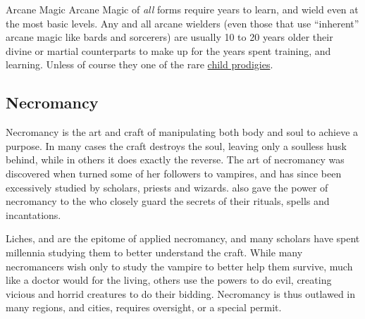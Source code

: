 \begin{35e}{Arcane Magic}
  Arcane Magic of \emph{all} forms require years to learn, and wield even at
  the most basic levels. Any and all arcane wielders (even those that use
  ``inherent'' arcane magic like bards and sorcerers) are usually 10 to 20
  years older their divine or martial counterparts to make up for the years
  spent training, and learning. Unless of course they one of the rare
  \hyperref[sec:Graham Balance]{child prodigies}.
\end{35e}

\subsection{Necromancy}
\label{sec:Necromancy}

Necromancy is the art and craft of manipulating both body and soul to achieve
a purpose. In many cases the craft destroys the soul, leaving only a soulless
husk behind, while in others it does exactly the reverse. The art of
necromancy was discovered when  turned some of her
followers to vampires, and has since been excessively studied by scholars,
priests and wizards.  also gave the power of necromancy to
the  who closely guard the secrets of their rituals, spells
and incantations.

Liches, and  are the epitome of applied necromancy, and
many scholars have spent millennia studying them to better understand the
craft. While many necromancers wish only to study the vampire to better help
them survive, much like a doctor would for the living, others use the powers to
do evil, creating vicious and horrid creatures to do their bidding. Necromancy
is thus outlawed in many regions, and cities, requires oversight, or a special
permit.






